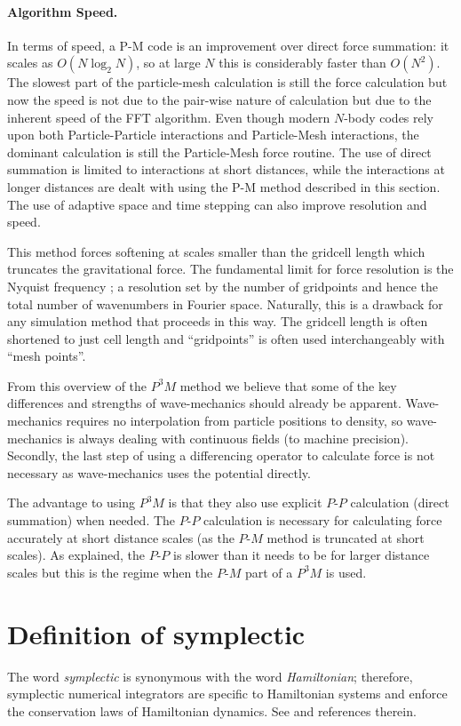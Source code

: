 \paragraph{Algorithm Speed.} In terms of speed, a P-M code is an improvement over direct force summation: it scales as $O(N \log_2 N)$, so at large $N$ this is considerably faster than $O(N^2)$. The slowest part of the particle-mesh calculation is still the force calculation but now the speed is not due to the pair-wise nature of calculation but due to the inherent speed of the FFT algorithm. Even though modern $N$-body codes rely upon both Particle-Particle interactions and Particle-Mesh interactions, the dominant calculation is still the Particle-Mesh force routine. The use of direct summation is limited to interactions at short distances, while the interactions at longer distances are dealt with using the P-M method described in this section. The use of adaptive space and time stepping can also improve resolution and speed. \citep{bib_aar, bib_nr}

This method forces softening at scales smaller than the gridcell length which truncates the gravitational force. The fundamental limit for force resolution is the Nyquist frequency \citep{bib_hmpc}; a resolution set by the number of gridpoints and hence the total number of wavenumbers in Fourier space. Naturally, this is a drawback for any simulation method that proceeds in this way. The gridcell length is often shortened to just cell length and ``gridpoints'' is often used interchangeably with ``mesh points''.

From this overview of the $P^3 M$ method we believe that some of the key differences and strengths of wave-mechanics should already be apparent. Wave-mechanics requires no interpolation from particle positions to density, so wave-mechanics is always dealing with continuous fields (to machine precision). Secondly, the last step of using a differencing operator to calculate force is not necessary as wave-mechanics uses the potential directly.

The advantage to using $P^3 M$ is that they also use explicit $P$-$P$ calculation (direct summation) when needed. The $P$-$P$ calculation is necessary for calculating force accurately at short distance scales (as the $P$-$M$ method is truncated at short scales). As explained, the $P$-$P$ is slower than it needs to be for larger distance scales but this is the regime when the $P$-$M$ part of a $P^3 M$ is used.

\section{Definition of symplectic}
\label{sec.sym}
The word {\it symplectic} is synonymous with the word {\it Hamiltonian}; therefore, symplectic numerical integrators are specific to Hamiltonian systems and enforce the conservation laws of Hamiltonian dynamics. See \citep{bib_saha} and references therein.

